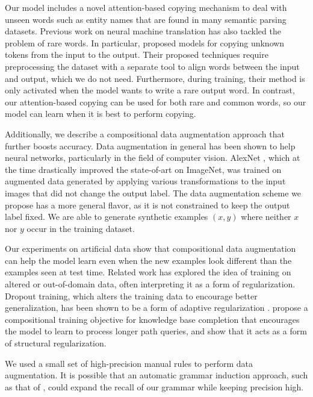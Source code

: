 \documentclass[11pt,letterpaper]{article}
\begin{document}
Our model includes a novel attention-based copying mechanism
to deal with unseen words such as entity names that are found in many semantic parsing datasets.
Previous work on neural machine translation has also tackled the problem of rare words.
In particular,  proposed models for copying unknown
tokens from the input to the output.
Their proposed techniques require preprocessing the dataset
with a separate tool to align words between the input and output,
which we do not need.
Furthermore, during training, their method is only activated when the model
wants to write a rare output word. 
In contrast, our attention-based copying can be used for 
both rare and common words,
so our model can learn when it is best to perform copying.

Additionally, we describe a compositional data augmentation approach that 
further boosts accuracy.
Data augmentation in general has been shown to help neural networks,
particularly in the field of computer vision.
AlexNet \cite{krizhevsky2012imagenet}, 
which at the time drastically improved
the state-of-art on ImageNet,
was trained on augmented data generated by applying various transformations
to the input images that did not change the output label.
The data augmentation scheme we propose has a more general flavor,
as it is not constrained to keep the output label fixed.
We are able to generate synthetic examples $(x, y)$
where neither $x$ nor $y$ occur in the training dataset.

Our experiments on artificial data show that
compositional data augmentation can help the model learn
even when the new examples look different than the examples seen at test time.  
Related work has explored the idea of training on 
altered or out-of-domain data, often interpreting
it as a form of regularization.
Dropout training, which alters the training data
to encourage better generalization, has
been shown to be a form of adaptive regularization
\cite{hinton2012improving,wager2014altitude}.
propose a compositional training objective for knowledge base completion
that encourages the model to learn to process longer path queries,
and show that it acts as a form of structural regularization.

We used a small set of high-precision manual rules to perform data augmentation.
It is possible that an automatic grammar induction approach,
such as that of ,
could expand the recall of our grammar while keeping precision high.
\end{document}
